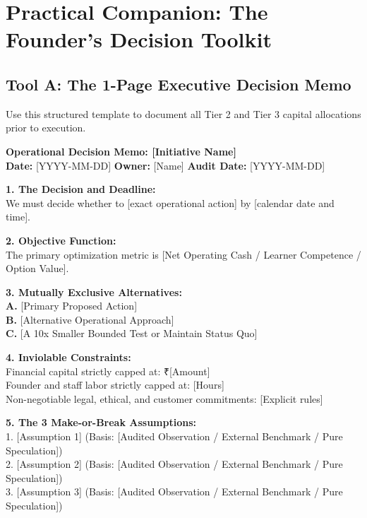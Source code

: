 \section{Practical Companion: The Founder's Decision Toolkit}

\subsection{Tool A: The 1-Page Executive Decision Memo}

Use this structured template to document all Tier 2 and Tier 3 capital allocations prior to execution.

\begin{tcolorbox}[
  enhanced,
  colback=BayesSurface!60,
  colframe=BayesBorder,
  boxrule=0.5pt,
  arc=3pt,
  left=4pt,right=4pt,top=4pt,bottom=4pt,
  boxsep=1pt
]
\scriptsize
\textbf{\large Operational Decision Memo: [Initiative Name]} \\
\textbf{Date:} [YYYY-MM-DD] \quad \textbf{Owner:} [Name] \quad \textbf{Audit Date:} [YYYY-MM-DD]

\vspace{4pt}
\textbf{1. The Decision and Deadline:} \\
We must decide whether to [exact operational action] by [calendar date and time].

\vspace{3pt}
\textbf{2. Objective Function:} \\
The primary optimization metric is [Net Operating Cash / Learner Competence / Option Value].

\vspace{3pt}
\textbf{3. Mutually Exclusive Alternatives:} \\
\textbf{A.} [Primary Proposed Action] \\
\textbf{B.} [Alternative Operational Approach] \\
\textbf{C.} [A 10x Smaller Bounded Test or Maintain Status Quo]

\vspace{3pt}
\textbf{4. Inviolable Constraints:} \\
\textbullet{} Financial capital strictly capped at: ₹[Amount] \\
\textbullet{} Founder and staff labor strictly capped at: [Hours] \\
\textbullet{} Non-negotiable legal, ethical, and customer commitments: [Explicit rules]

\vspace{3pt}
\textbf{5. The 3 Make-or-Break Assumptions:} \\
1. [Assumption 1] (Basis: [Audited Observation / External Benchmark / Pure Speculation]) \\
2. [Assumption 2] (Basis: [Audited Observation / External Benchmark / Pure Speculation]) \\
3. [Assumption 3] (Basis: [Audited Observation / External Benchmark / Pure Speculation])


\end{tcolorbox}
